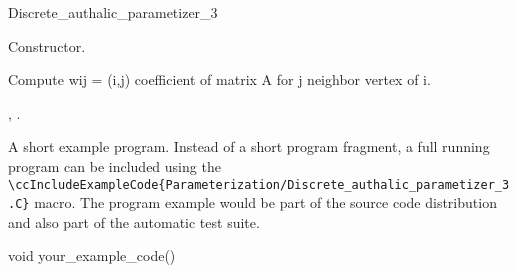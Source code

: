 \begin{ccRefClass}{Discrete_authalic_parametizer_3}
\ccCreation
{}  %

{
Constructor.
}


\ccOperations

{
Compute wij = (i,j) coefficient of matrix A for j neighbor vertex of i.
}


\ccSeeAlso

,
.

\ccExample

A short example program.
Instead of a short program fragment, a full running program can be
included using the 
\verb|\ccIncludeExampleCode{Parameterization/Discrete_authalic_parametizer_3.C}| 
macro. The program example would be part of the source code distribution and
also part of the automatic test suite.

\begin{ccExampleCode}
void your_example_code() {
}
\end{ccExampleCode}


\end{ccRefClass}


